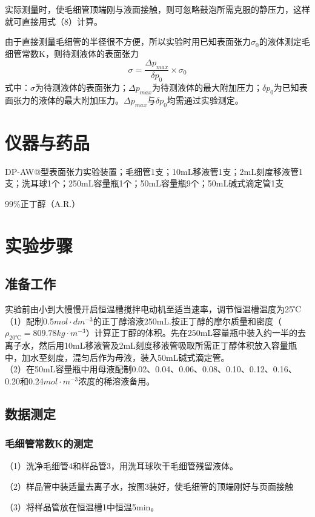 \documentclass[hyperref,a4paper,UTF8]{ctexart}
\makeatletter
\newcommand{\Rmnum}[1]{\expandafter\@slowromancap\romannumeral #1@}
\makeatother
\begin{document}
实际测量时，使毛细管顶端刚与液面接触，则可忽略鼓泡所需克服的静压力，这样就可直接用式（8）计算。


由于直接测量毛细管的半径很不方便，所以实验时用已知表面张力$\sigma_{0}$的液体测定毛细管常数K，则待测液体的表面张力
\begin{equation}
    \sigma=\frac{\Delta p_{max}}{\delta p_{0}} \times \sigma_{0}
\end{equation}
式中：$\sigma$为待测液体的表面张力；$\Delta p_{max}$为待测液体的最大附加压力；$\delta p_{0}$为已知表面张力的液体的最大附加压力。$\Delta p_{max}$与$\delta p_{0}$均需通过实验测定。
\section{仪器与药品}
DP-AW\Rmnum{2}型表面张力实验装置；毛细管1支；10mL移液管1支；2mL刻度移液管1支；洗耳球1个；250mL容量瓶1个；50mL容量瓶9个；50mL碱式滴定管1支


99\%正丁醇（A.R.）

\section{实验步骤}
\subsection{准备工作}
实验前由小到大慢慢开启恒温槽搅拌电动机至适当速率，调节恒温槽温度为25℃\\
（1）配制0.5$mol\cdot dm^{-3}$的正丁醇溶液250mL.按正丁醇的摩尔质量和密度（$\rho_{20℃}=809.78kg \cdot m^{-3}$）计算正丁醇的体积。先在250mL容量瓶中装入约一半的去离子水，然后用10mL移液管及2mL刻度移液管吸取所需正丁醇体积放入容量瓶中，加水至刻度，混匀后作为母液，装入50mL碱式滴定管。\\
（2）在50mL容量瓶中用母液配制0.02、0.04、0.06、0.08、0.10、0.12、0.16、0.20和0.24$mol\cdot m^{-3}$浓度的稀溶液备用。
\subsection{数据测定}
\subsubsection{毛细管常数K的测定}
（1）洗净毛细管4和样品管3，用洗耳球吹干毛细管残留液体。


（2）样品管中装适量去离子水，按图3装好，使毛细管的顶端刚好与页面接触


（3）将样品管放在恒温槽1中恒温5min。
\end{document}
